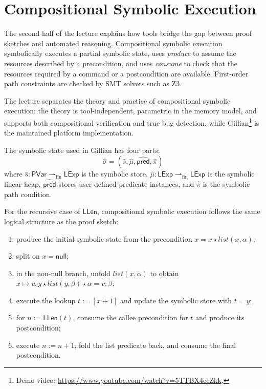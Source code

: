 \documentclass[11pt]{article}
\newcommand{\LLen}{\mathsf{LLen}}
\newcommand{\Pred}{\mathsf{pred}}
\newcommand{\Null}{\mathsf{null}}
\begin{document}
\section{Compositional Symbolic Execution}

The second half of the lecture explains how tools bridge the gap between proof sketches and automated reasoning. Compositional symbolic execution symbolically executes a partial symbolic state, uses \emph{produce} to assume the resources described by a precondition, and uses \emph{consume} to check that the resources required by a command or a postcondition are available. First-order path constraints are checked by SMT solvers such as Z3.

The lecture separates the theory and practice of compositional symbolic execution: the theory is tool-independent, parametric in the memory model, and supports both compositional verification and true bug detection, while Gillian\footnote{Demo video: \url{https://www.youtube.com/watch?v=5TTBX4ecZkk}.} is the maintained platform implementation.

The symbolic state used in Gillian has four parts:
\[
\hat{\sigma} = (\hat{s}, \hat{\mu}, \widehat{\Pred}, \hat{\pi})
\]
where $\hat{s} : \mathsf{PVar} \rightharpoonup_{\mathrm{fin}} \mathsf{LExp}$ is the symbolic store, $\hat{\mu} : \mathsf{LExp} \rightharpoonup_{\mathrm{fin}} \mathsf{LExp}$ is the symbolic linear heap, $\widehat{\Pred}$ stores user-defined predicate instances, and $\hat{\pi}$ is the symbolic path condition.

For the recursive case of $\LLen$, compositional symbolic execution follows the same logical structure as the proof sketch:
\begin{enumerate}
	\item produce the initial symbolic state from the precondition $x = x \star list(x,\alpha)$;
	\item split on $x = \Null$;
	\item in the non-null branch, unfold $list(x,\alpha)$ to obtain $x \mapsto v,y \star list(y,\beta) \star \alpha = v:\beta$;
	\item execute the lookup $t := [x+1]$ and update the symbolic store with $t = y$;
	\item for $n := \LLen(t)$, consume the callee precondition for $t$ and produce its postcondition;
	\item execute $n := n+1$, fold the list predicate back, and consume the final postcondition.
\end{enumerate}
\end{document}
